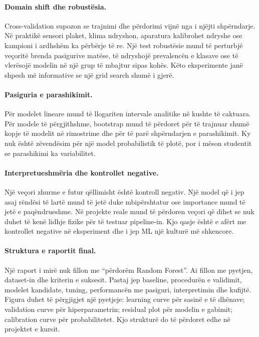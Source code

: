 \documentclass[12pt,a4paper,oneside]{book}
\begin{document}
\paragraph{Domain shift dhe robustësia.}
Cross-validation supozon se trajnimi dhe përdorimi vijnë nga i njëjti shpërndarje. Në praktikë sensori plaket, klima ndryshon, aparatura kalibrohet ndryshe ose kampioni i ardhshëm ka përbërje të re. Një test robustësie mund të perturbjë veçoritë brenda pasigurive matëse, të ndryshojë prevalencën e klasave ose të vlerësojë modelin në një grup të mbajtur sipas kohës. Këto eksperimente janë shpesh më informative se një grid search shumë i gjerë.

\paragraph{Pasiguria e parashikimit.}
Për modelet lineare mund të llogariten intervale analitike në kushte të caktuara. Për modele të përgjithshme, bootstrap mund të përdoret për të trajnuar shumë kopje të modelit në rimostrime dhe për të parë shpërndarjen e parashikimit. Ky nuk është zëvendësim për një model probabilistik të plotë, por i mëson studentit se parashikimi ka variabilitet.

\paragraph{Interpretueshmëria dhe kontrollet negative.}
Një veçori zhurme e futur qëllimisht është kontroll negativ. Një model që i jep asaj rëndësi të lartë mund të jetë duke mbipërshtatur ose importance mund të jetë e paqëndrueshme. Në projekte reale mund të përdoren veçori që dihet se nuk duhet të kenë lidhje fizike për të testuar pipeline-in. Kjo qasje është e afërt me kontrollet negative në eksperiment dhe i jep ML një kulturë më shkencore.

\paragraph{Struktura e raportit final.}
Një raport i mirë nuk fillon me ``përdorëm Random Forest''. Ai fillon me pyetjen, dataset-in dhe kriterin e suksesit. Pastaj jep baseline, procedurën e validimit, modelet kandidate, tuning, performancën me pasiguri, interpretimin dhe kufijtë. Figura duhet të përgjigjet një pyetjeje: learning curve për sasinë e të dhënave; validation curve për hiperparametrin; residual plot për modelin e gabimit; calibration curve për probabilitetet. Kjo strukturë do të përdoret edhe në projektet e kursit.
\end{document}
